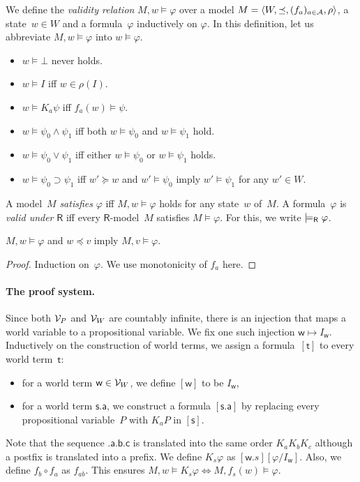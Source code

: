 \begin{definition}
 We define the \textit{validity relation} $M,w\models\varphi$ over a model
 $M = \langle{W,\preceq,(f_a)_{a\in \mathcal A},\rho}\rangle$, a state~$w\in W$ and a
 formula~$\varphi$ inductively on $\varphi$.
 In this definition, let
 us abbreviate $M,w\models \varphi$ into $w\models \varphi$\enspace.
\newcommand{\m}{}
\begin{itemize}
\item $w\models \bot$ never holds.
\item $w\models I$ iff
$w \in
 \rho(I)$.
\item	    $w\models K_a \psi$ iff
	    $f_a(w)\models \psi$.
\item $w\models \psi_0\wedge\psi_1$ iff both
 $w\models \psi_0$ and $w\models \psi_1$ hold.
\item
 $ w\models \psi_0\vee\psi_1$ iff either
 $ w\models \psi_0$ or $w\models \psi_1$ holds.
\item
	   $w\models \psi_0\supset\psi_1$ iff 
	   $w'\succeq w$ and $w'\models \psi_0$ imply
	   $w'\models\psi_1$ for any $w'\in W$\enspace.
\end{itemize}
\end{definition}
A model~$M$ \textit{satisfies} $\varphi$ iff $M,w\models\varphi$ holds for any
state~$w$ of~$M$.
A formula~$\varphi$ is \textit{valid under} $\mathsf R$ iff
every $\mathsf R$-model~$M$ satisfies $M\models \varphi$.
For this, we write $\models_{\mathsf R} \varphi$\enspace.

\begin{lemma}
 \label{monot}
 $M,w\models\varphi$ and $w\preceq v$ imply 
$M,v\models\varphi$.
\end{lemma}
\begin{proof}
 Induction on~$\varphi$.
 We use monotonicity of $f_a$ here.
\end{proof}

\paragraph{The proof system.}
Since both $\mathcal V_P$ and $\mathcal V_W$ are countably infinite,
there is an injection that maps a world variable to a propositional
variable.
We fix one such injection
$\mathsf w\mapsto I_{\mathsf w}$.
Inductively on the construction of world terms,
we assign a formula~$[\mathsf t]$ to every world term~$\mathsf t$:
\begin{itemize}
 \item for a world term $\mathsf w\in \mathcal V_W$, we define $[\mathsf w]$ to be
       $I_{\mathsf w}$,
 \item for a world term $\mathsf{s.a}$, we construct
 a formula $[\mathsf{s.a}]$ by
replacing every propositional variable~$P$ with $K_aP$ in $[\mathsf s]$.
\end{itemize}
Note that the sequence $\mathsf{.a.b.c}$ is translated into the same
order $K_a K_b K_c$ although a postfix is translated into a prefix.
We define $K_s\varphi$ as $[\mathsf w.s][\varphi/I_{\mathsf w}]$.
Also, we define $f_b\circ f_a$ as $f_{ab}$.  This ensures $M, w\models
K_s\varphi\Leftrightarrow M,f_s(w)\models\varphi$.

